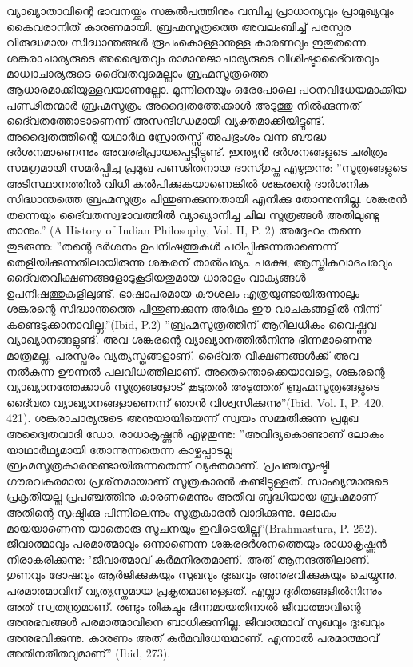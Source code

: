 വ്യാഖ്യാതാവിന്റെ ഭാവനയ്ക്കും സങ്കല്‍പത്തിനും വമ്പിച്ച പ്രാധാന്യവും പ്രാമുഖ്യവും കൈവരാനിത് കാരണമായി. ബ്രഹ്മസൂത്രത്തെ അവലംബിച്ച് പരസ്പര വിരുദ്ധമായ സിദ്ധാന്തങ്ങള്‍ രൂപംകൊള്ളാനുള്ള കാരണവും ഇതുതന്നെ. ശങ്കരാചാര്യരുടെ അദ്വൈതവും രാമാനുജാചാര്യരുടെ വിശിഷ്ടാദൈ്വതവും മാധ്വാചാര്യരുടെ ദൈ്വതവുമെല്ലാം ബ്രഹ്മസൂത്രത്തെ ആധാരമാക്കിയുള്ളവയാണല്ലോ. മൂന്നിനെയും ഒരേപോലെ പഠനവിധേയമാക്കിയ പണ്ഢിതന്മാര്‍ ബ്രഹ്മസൂത്രം അദ്വൈതത്തേക്കാള്‍ അടുത്തു നില്‍ക്കുന്നത് ദൈ്വതത്തോടാണെന്ന് അസന്ദിഗ്ധമായി വ്യക്തമാക്കിയിട്ടുണ്ട്. അദ്വൈതത്തിന്റെ യഥാര്‍ഥ സ്രോതസ്സ് അപഭ്രംശം വന്ന ബൗദ്ധ ദര്‍ശനമാണെന്നും അവരഭിപ്രായപ്പെട്ടിട്ടുണ്ട്.
ഇന്ത്യന്‍ ദര്‍ശനങ്ങളുടെ ചരിത്രം സമഗ്രമായി സമര്‍പ്പിച്ച പ്രമുഖ പണ്ഢിതനായ ദാസ്ഗുപ്ത എഴുതുന്നു: ''സൂത്രങ്ങളുടെ അടിസ്ഥാനത്തില്‍ വിധി കല്‍പിക്കുകയാണെങ്കില്‍ ശങ്കരന്റെ ദാര്‍ശനിക സിദ്ധാന്തത്തെ ബ്രഹ്മസൂത്രം പിന്തുണക്കുന്നതായി എനിക്കു തോന്നുന്നില്ല. ശങ്കരന്‍ തന്നെയും ദൈ്വതസ്വഭാവത്തില്‍ വ്യാഖ്യാനിച്ച ചില സൂത്രങ്ങള്‍ അതിലുണ്ടു താനും.'' (A History of Indian Philosophy, Vol. II, P. 2)
അദ്ദേഹം തന്നെ തുടരുന്നു: ''തന്റെ ദര്‍ശനം ഉപനിഷത്തുകള്‍ പഠിപ്പിക്കുന്നതാണെന്ന് തെളിയിക്കുന്നതിലായിരുന്നു ശങ്കരന് താല്‍പര്യം. പക്ഷേ, ആസ്തികവാദപരവും ദൈ്വതവീക്ഷണങ്ങളോടുകൂടിയതുമായ ധാരാളം വാക്യങ്ങള്‍ ഉപനിഷത്തുകളിലുണ്ട്. ഭാഷാപരമായ കൗശലം എത്രയുണ്ടായിരുന്നാലും ശങ്കരന്റെ സിദ്ധാന്തത്തെ പിന്തുണക്കുന്ന അര്‍ഥം ഈ വാചകങ്ങളില്‍ നിന്ന് കണ്ടെടുക്കാനാവില്ല.''(Ibid, P.2)
''ബ്രഹ്മസൂത്രത്തിന് ആറിലധികം വൈഷ്ണവ വ്യാഖ്യാനങ്ങളുണ്ട്. അവ ശങ്കരന്റെ വ്യാഖ്യാനത്തില്‍നിന്നു ഭിന്നമാണെന്നു മാത്രമല്ല, പരസ്പരം വ്യത്യസ്തങ്ങളാണ്. ദൈ്വത വീക്ഷണങ്ങള്‍ക്ക് അവ നല്‍കുന്ന ഊന്നല്‍ പലവിധത്തിലാണ്. അതെന്തൊക്കെയാവട്ടെ, ശങ്കരന്റെ വ്യാഖ്യാനത്തേക്കാള്‍ സൂത്രങ്ങളോട് കൂടുതല്‍ അടുത്തത് ബ്രഹ്മസൂത്രങ്ങളുടെ ദൈ്വത വ്യാഖ്യാനങ്ങളാണെന്ന് ഞാന്‍ വിശ്വസിക്കുന്നു''(Ibid, Vol. I, P. 420, 421).
ശങ്കരാചാര്യരുടെ അനുയായിയെന്ന് സ്വയം സമ്മതിക്കുന്ന പ്രമുഖ അദ്വൈതവാദി ഡോ. രാധാകൃഷ്ണന്‍ എഴുതുന്നു: ''അവിദ്യകൊണ്ടാണ് ലോകം യാഥാര്‍ഥ്യമായി തോന്നുന്നതെന്ന കാഴ്ചപ്പാടല്ല ബ്രഹ്മസൂത്രകാരനുണ്ടായിരുന്നതെന്ന് വ്യക്തമാണ്. പ്രപഞ്ചസൃഷ്ടി ഗൗരവകരമായ പ്രശ്‌നമായാണ് സൂത്രകാരന്‍ കണ്ടിട്ടുള്ളത്. സാംഖ്യന്മാരുടെ പ്രകൃതിയല്ല പ്രപഞ്ചത്തിനു കാരണമെന്നും അതീവ ബുദ്ധിയായ ബ്രഹ്മമാണ് അതിന്റെ സൃഷ്ടിക്കു പിന്നിലെന്നും സൂത്രകാരന്‍ വാദിക്കുന്നു. ലോകം മായയാണെന്ന യാതൊരു സൂചനയും ഇവിടെയില്ല''(Brahmastura, P. 252).
ജീവാത്മാവും പരമാത്മാവും ഒന്നാണെന്ന ശങ്കരദര്‍ശനത്തെയും രാധാകൃഷ്ണന്‍ നിരാകരിക്കുന്നു: 'ജീവാത്മാവ് കര്‍മനിരതമാണ്. അത് ആനന്ദത്തിലാണ്. ഗുണവും ദോഷവും ആര്‍ജിക്കുകയും സുഖവും ദുഃഖവും അനുഭവിക്കുകയും ചെയ്യുന്നു. പരമാത്മാവിന് വ്യത്യസ്തമായ പ്രകൃതമാണുള്ളത്. എല്ലാ ദുരിതങ്ങളില്‍നിന്നും അത് സ്വതന്ത്രമാണ്. രണ്ടും തികച്ചും ഭിന്നമായതിനാല്‍ ജീവാത്മാവിന്റെ അനുഭവങ്ങള്‍ പരമാത്മാവിനെ ബാധിക്കുന്നില്ല. ജീവാത്മാവ് സുഖവും ദുഃഖവും അനുഭവിക്കുന്നു. കാരണം അത് കര്‍മവിധേയമാണ്. എന്നാല്‍ പരമാത്മാവ് അതിനതീതവുമാണ്'' (Ibid, 273).
